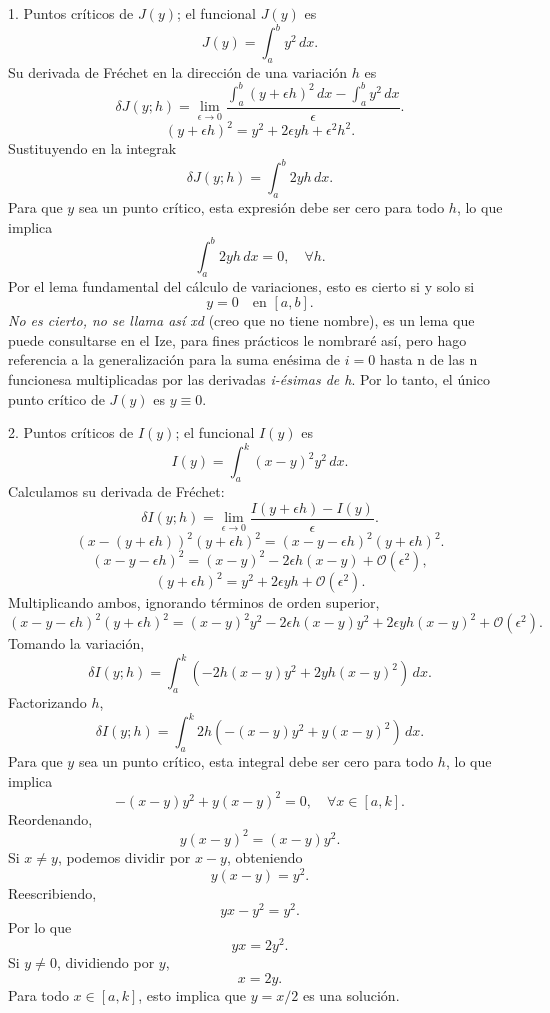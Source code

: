 \documentclass{elsarticle}
\begin{document}
1. Puntos críticos de \( J(y) \); el funcional \( J(y) \) es  
\[
J(y) = \int_a^b y^2 \,dx.
\]  
Su derivada de Fréchet en la dirección de una variación \( h \) es  
\[
\delta J(y; h) = \lim_{\epsilon \to 0} \frac{\int_a^b (y + \epsilon h)^2 \,dx - \int_a^b y^2 \,dx}{\epsilon}.
\]    
\[
(y + \epsilon h)^2 = y^2 + 2\epsilon y h + \epsilon^2 h^2.
\]  
Sustituyendo en la integrak
\[
\delta J(y; h) = \int_a^b 2y h \,dx.
\]  
Para que \( y \) sea un punto crítico, esta expresión debe ser cero para todo \( h \), lo que implica  
\[
\int_a^b 2y h \,dx = 0, \quad \forall h.
\]  
Por el lema fundamental del cálculo de variaciones, esto es cierto si y solo si  
\[
y = 0 \quad \text{en } [a, b].
\]
\textit{No es cierto, no se llama así xd} (creo que no tiene nombre), es un lema que puede consultarse en el Ize, para fines prácticos le nombraré así, pero hago referencia a la generalización para la suma enésima de $i=0$ hasta n de las n funcionesa multiplicadas por las derivadas \textit{i-ésimas de h}. Por lo tanto, el único punto crítico de \( J(y) \) es \( y \equiv 0 \).  

2. Puntos críticos de \( I(y) \); el funcional \( I(y) \) es  
\[
I(y) = \int_a^k (x - y)^2 y^2 \,dx.
\]  
Calculamos su derivada de Fréchet:  
\[
\delta I(y; h) = \lim_{\epsilon \to 0} \frac{I(y + \epsilon h) - I(y)}{\epsilon}.
\]  
\[
(x - (y + \epsilon h))^2 (y + \epsilon h)^2 = (x - y - \epsilon h)^2 (y + \epsilon h)^2.
\]  
\[
(x - y - \epsilon h)^2 = (x - y)^2 - 2\epsilon h (x - y) + \mathcal{O}(\epsilon^2),
\]
\[
(y + \epsilon h)^2 = y^2 + 2\epsilon y h + \mathcal{O}(\epsilon^2).
\]  
Multiplicando ambos, ignorando términos de orden superior,  
\[
(x - y - \epsilon h)^2 (y + \epsilon h)^2 = (x - y)^2 y^2 - 2\epsilon h (x - y) y^2 + 2\epsilon y h (x - y)^2 + \mathcal{O}(\epsilon^2).
\]  
Tomando la variación,  
\[
\delta I(y; h) = \int_a^k (-2h (x - y) y^2 + 2y h (x - y)^2) \,dx.
\]  
Factorizando \( h \),  
\[
\delta I(y; h) = \int_a^k 2h (- (x - y) y^2 + y (x - y)^2) \,dx.
\]  
Para que \( y \) sea un punto crítico, esta integral debe ser cero para todo \( h \), lo que implica  
\[
- (x - y) y^2 + y (x - y)^2 = 0, \quad \forall x \in [a, k].
\]  
Reordenando,  
\[
y (x - y)^2 = (x - y) y^2.
\]  
Si \( x \neq y \), podemos dividir por \( x - y \), obteniendo  
\[
y (x - y) = y^2.
\]  
Reescribiendo,  
\[
y x - y^2 = y^2.
\]  
Por lo que  
\[
y x = 2y^2.
\]  
Si \( y \neq 0 \), dividiendo por \( y \),  
\[
x = 2y.
\]  
Para todo \( x \in [a, k] \), esto implica que \( y = x/2 \) es una solución.  
\end{document}
